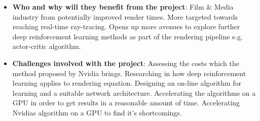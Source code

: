 \documentclass[ %
                    author={Callum Pearce},
                supervisor={Dr. Neill Campbell},
                    degree={MEng},
                     title={How effective are Temporal difference learning methods for reducing the number of zero contribution light paths while still accurately approximating Global Illumination in Path tracing?},
                  subtitle={},
                      type={research},
                      year={2019} ]{dissertation}
\begin{document}
\begin{itemize}
\item \textbf{Who and why will they benefit from the project}: Film \& Media industry from potentially improved render times. More targeted towards reaching real-time ray-tracing. Opens up more avenues to explore further deep reinforcement learning methods as part of the rendering pipeline e.g. actor-critic algorithm.

\item \textbf{Challenges involved with the project}: Assessing the costs which the method proposed by Nvidia brings. Researching in how deep reinforcement learning applies to rendering equation. Designing an on-line algorithm for learning and a suitable network architecture. Accelerating the algorithms on a GPU in order to get results in a reasonable amount of time. Accelerating Nvidias algorithm on a GPU to find it's shortcomings.

\end{itemize}
\end{document}
